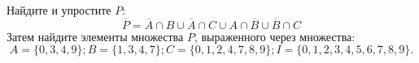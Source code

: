 \question
Найдите и упростите $P$:
\begin{equation*}
\overline{P} = \overline{A} \cap B \cup \overline{A} \cap C \cup A \cap \overline{B} \cup \overline{B} \cap C
\end{equation*}
Затем найдите элементы множества $P$, выраженного через множества:
\begin{equation*}
	A = \{0, 3, 4, 9\};
	B = \{1, 3, 4, 7\};
	C = \{0, 1, 2, 4, 7, 8, 9\};
	I = \{0, 1, 2, 3, 4, 5, 6, 7, 8, 9\}.
\end{equation*}